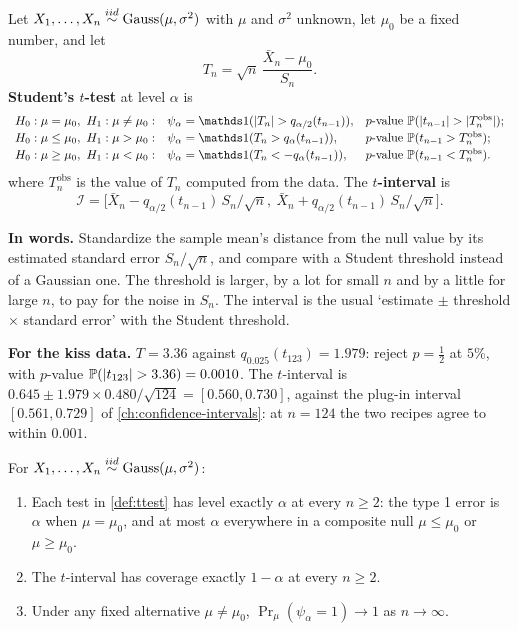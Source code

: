 \begin{definition}
\label{def:ttest}
Let $X_1, \ldots, X_n \stackrel{iid}{\sim} \text{Gauss}(\mu, \sigma^2)$ with $\mu$ and $\sigma^2$ unknown, let $\mu_0$ be a fixed number, and let
\[
T_n = \sqrt{n}\,\frac{\bar{X}_n - \mu_0}{S_n}.
\]
\textbf{Student's $t$-test} at level $\alpha$ is
\[
\begin{array}{lll}
H_0: \mu = \mu_0,\ H_1: \mu \neq \mu_0: & \psi_\alpha = \ind(\abs{T_n} > q_{\alpha/2}(t_{n-1})), & p\text{-value } \Pr(\abs{t_{n-1}} > \abs{T_n^{\text{obs}}}); \\[2pt]
H_0: \mu \leq \mu_0,\ H_1: \mu > \mu_0: & \psi_\alpha = \ind(T_n > q_{\alpha}(t_{n-1})), & p\text{-value } \Pr(t_{n-1} > T_n^{\text{obs}}); \\[2pt]
H_0: \mu \geq \mu_0,\ H_1: \mu < \mu_0: & \psi_\alpha = \ind(T_n < -q_{\alpha}(t_{n-1})), & p\text{-value } \Pr(t_{n-1} < T_n^{\text{obs}}).
\end{array}
\]
where $T_n^{\text{obs}}$ is the value of $T_n$ computed from the data.
The \textbf{$t$-interval} is
\[
\mathcal{I} = \big[\bar{X}_n - q_{\alpha/2}(t_{n-1})\,S_n/\sqrt{n},\ \bar{X}_n + q_{\alpha/2}(t_{n-1})\,S_n/\sqrt{n}\big].
\]
\end{definition}

\begin{inwords}
\textbf{In words.} Standardize the sample mean's distance from the null value by its estimated standard error $S_n/\sqrt{n}$, and compare with a Student threshold instead of a Gaussian one. The threshold is larger, by a lot for small $n$ and by a little for large $n$, to pay for the noise in $S_n$. The interval is the usual `estimate $\pm$ threshold $\times$ standard error' with the Student threshold.
\par\smallskip
\textbf{For the kiss data.} $T = 3.36$ against $q_{0.025}(t_{123}) = 1.979$: reject $p = \frac12$ at $5\%$, with $p$-value $\mathbb{P}(\lvert t_{123}\rvert > 3.36) = 0.0010$. The $t$-interval is $0.645 \pm 1.979 \times 0.480/\sqrt{124} = [0.560, 0.730]$, against the plug-in interval $[0.561, 0.729]$ of \cref{ch:confidence-intervals}: at $n = 124$ the two recipes agree to within $0.001$.
\end{inwords}

\begin{proposition}
\label{prop:ttest-level}
For $X_1, \ldots, X_n \stackrel{iid}{\sim} \text{Gauss}(\mu, \sigma^2)$:
\begin{enumerate}[nosep]
\item Each test in \cref{def:ttest} has level exactly $\alpha$ at every $n \geq 2$: the type 1 error is $\alpha$ when $\mu = \mu_0$, and at most $\alpha$ everywhere in a composite null $\mu \leq \mu_0$ or $\mu \geq \mu_0$.
\item The $t$-interval has coverage exactly $1 - \alpha$ at every $n \geq 2$.
\item Under any fixed alternative $\mu \neq \mu_0$, $\Pr_\mu(\psi_\alpha = 1) \to 1$ as $n \to \infty$.
\end{enumerate}
\end{proposition}

